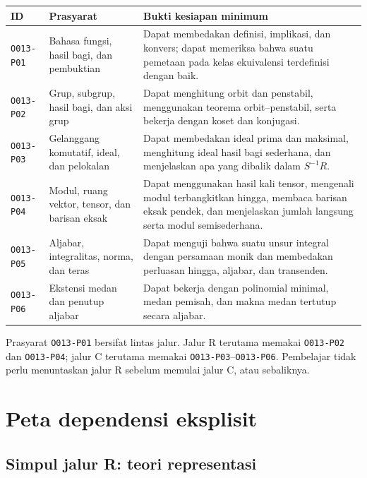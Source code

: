 \documentclass[11pt,a4paper]{article}
\newcommand{\oid}[1]{\texttt{#1}}
\begin{document}
\begin{longtable}{>{\raggedright\arraybackslash}p{2.3cm}p{5.0cm}p{7.0cm}}
\toprule
ID & Prasyarat & Bukti kesiapan minimum \\
\midrule
\endhead
\oid{O013-P01} & Bahasa fungsi, hasil bagi, dan pembuktian & Dapat membedakan
definisi, implikasi, dan konvers; dapat memeriksa bahwa suatu pemetaan pada
kelas ekuivalensi terdefinisi dengan baik. \\
\oid{O013-P02} & Grup, subgrup, hasil bagi, dan aksi grup & Dapat menghitung
orbit dan penstabil, menggunakan teorema orbit--penstabil, serta bekerja dengan
koset dan konjugasi. \\
\oid{O013-P03} & Gelanggang komutatif, ideal, dan pelokalan & Dapat membedakan
ideal prima dan maksimal, menghitung ideal hasil bagi sederhana, dan
menjelaskan apa yang dibalik dalam $S^{-1}R$. \\
\oid{O013-P04} & Modul, ruang vektor, tensor, dan barisan eksak & Dapat
menggunakan hasil kali tensor, mengenali modul terbangkitkan hingga, membaca
barisan eksak pendek, dan menjelaskan jumlah langsung serta modul
semisederhana. \\
\oid{O013-P05} & Aljabar, integralitas, norma, dan teras & Dapat menguji bahwa
suatu unsur integral dengan persamaan monik dan membedakan perluasan hingga,
aljabar, dan transenden. \\
\oid{O013-P06} & Ekstensi medan dan penutup aljabar & Dapat bekerja dengan
polinomial minimal, medan pemisah, dan makna medan tertutup secara aljabar. \\
\bottomrule
\end{longtable}

Prasyarat \oid{O013-P01} bersifat lintas jalur. Jalur R terutama memakai
\oid{O013-P02} dan \oid{O013-P04}; jalur C terutama memakai
\oid{O013-P03}--\oid{O013-P06}. Pembelajar tidak perlu menuntaskan jalur R
sebelum memulai jalur C, atau sebaliknya.

\section{Peta dependensi eksplisit}

\subsection*{Simpul jalur R: teori representasi}
\end{document}
